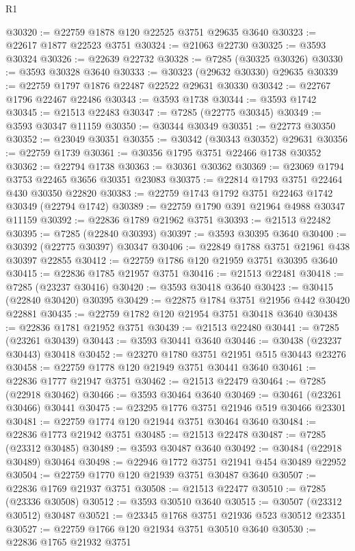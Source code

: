 \begin{lexlean}{R1}
\begin{coremodule}
@30320 := @22759 @1878 @120 @22525 @3751 @29635 @3640
@30323 := @22617 @1877 @22523 @3751
@30324 := @21063 @22730
@30325 := @3593 @30324
@30326 := @22639 @22732
@30328 := @7285 (@30325 @30326)
@30330 := @3593 @30328 @3640
@30333 := @30323 (@29632 @30330) @29635
@30339 := @22759 @1797 @1876 @22487 @22522 @29631 @30330
@30342 := @22767 @1796 @22467 @22486
@30343 := @3593 @1738
@30344 := @3593 @1742
@30345 := @21513 @22483
@30347 := @7285 (@22775 @30345)
@30349 := @3593 @30347 @11159
@30350 := @30344 @30349
@30351 := @22773 @30350
@30352 := @23049 @30351
@30355 := @30342 (@30343 @30352) @29631
@30356 := @22759 @1739
@30361 := @30356 @1795 @3751 @22466 @1738 @30352
@30362 := @22794 @1738
@30363 := @30361 @30362
@30369 := @23069 @1794 @3753 @22465 @3656 @30351 @23083
@30375 := @22814 @1793 @3751 @22464 @430 @30350 @22820
@30383 := @22759 @1743 @1792 @3751 @22463 @1742 @30349 (@22794 @1742)
@30389 := @22759 @1790 @391 @21964 @4988 @30347 @11159
@30392 := @22836 @1789 @21962 @3751
@30393 := @21513 @22482
@30395 := @7285 (@22840 @30393)
@30397 := @3593 @30395 @3640
@30400 := @30392 (@22775 @30397) @30347
@30406 := @22849 @1788 @3751 @21961 @438 @30397 @22855
@30412 := @22759 @1786 @120 @21959 @3751 @30395 @3640
@30415 := @22836 @1785 @21957 @3751
@30416 := @21513 @22481
@30418 := @7285 (@23237 @30416)
@30420 := @3593 @30418 @3640
@30423 := @30415 (@22840 @30420) @30395
@30429 := @22875 @1784 @3751 @21956 @442 @30420 @22881
@30435 := @22759 @1782 @120 @21954 @3751 @30418 @3640
@30438 := @22836 @1781 @21952 @3751
@30439 := @21513 @22480
@30441 := @7285 (@23261 @30439)
@30443 := @3593 @30441 @3640
@30446 := @30438 (@23237 @30443) @30418
@30452 := @23270 @1780 @3751 @21951 @515 @30443 @23276
@30458 := @22759 @1778 @120 @21949 @3751 @30441 @3640
@30461 := @22836 @1777 @21947 @3751
@30462 := @21513 @22479
@30464 := @7285 (@22918 @30462)
@30466 := @3593 @30464 @3640
@30469 := @30461 (@23261 @30466) @30441
@30475 := @23295 @1776 @3751 @21946 @519 @30466 @23301
@30481 := @22759 @1774 @120 @21944 @3751 @30464 @3640
@30484 := @22836 @1773 @21942 @3751
@30485 := @21513 @22478
@30487 := @7285 (@23312 @30485)
@30489 := @3593 @30487 @3640
@30492 := @30484 (@22918 @30489) @30464
@30498 := @22946 @1772 @3751 @21941 @454 @30489 @22952
@30504 := @22759 @1770 @120 @21939 @3751 @30487 @3640
@30507 := @22836 @1769 @21937 @3751
@30508 := @21513 @22477
@30510 := @7285 (@23336 @30508)
@30512 := @3593 @30510 @3640
@30515 := @30507 (@23312 @30512) @30487
@30521 := @23345 @1768 @3751 @21936 @523 @30512 @23351
@30527 := @22759 @1766 @120 @21934 @3751 @30510 @3640
@30530 := @22836 @1765 @21932 @3751

\end{coremodule}
\end{lexlean}
